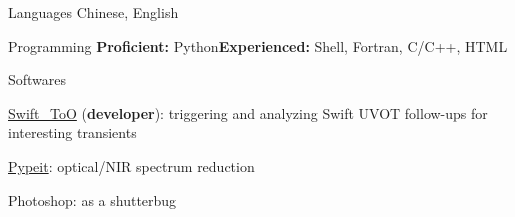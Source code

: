 


\begin{cvskills}


\cvskill
{Languages} %
{Chinese, English} %


\cvskill
{Programming} %
{\textbf{Proficient:} Python\quad \textbf{Experienced:} Shell, Fortran, C/C++, HTML} %



\cvskill
{Softwares} %
{\begin{cvitems}
    \item {\href{https://github.com/slowdivePTG/Swift_ToO}{Swift\_ToO} (\textbf{developer}): triggering and analyzing Swift UVOT follow-ups for interesting transients}
    \item \href{https://pypeit.readthedocs.io/en/release/}{Pypeit}: optical/NIR spectrum reduction
    \item Photoshop: as a shutterbug
\end{cvitems}}%

\end{cvskills}